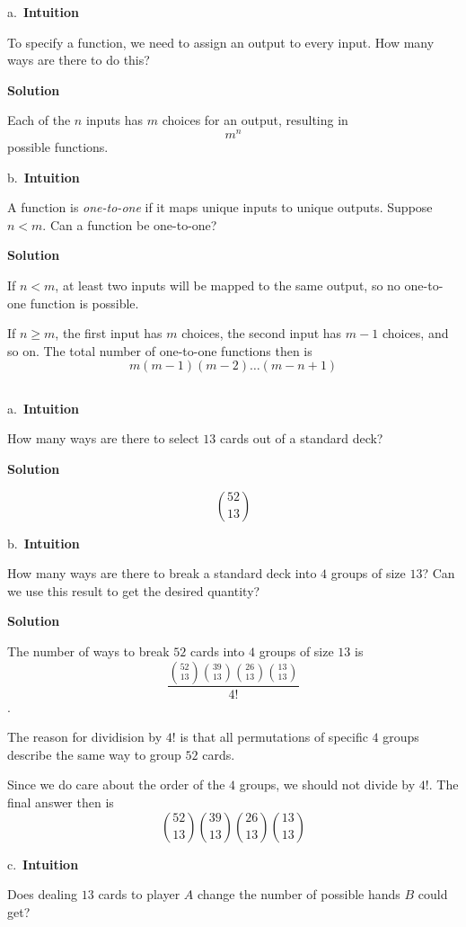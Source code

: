 \documentclass[]{book}
\begin{document}
a.~\textbf{Intuition}

To specify a function, we need to assign an output to every input. How
many ways are there to do this?

 \textbf{Solution}

Each of the \(n\) inputs has \(m\) choices for an output, resulting in
\[m^{n}\] possible functions.

b.~\textbf{Intuition}

A function is \emph{one-to-one} if it maps unique inputs to unique
outputs. Suppose \(n < m\). Can a function be one-to-one?

 \textbf{Solution}

If \(n < m\), at least two inputs will be mapped to the same output, so
no one-to-one function is possible.

If \(n \geq m\), the first input has \(m\) choices, the second input has
\(m - 1\) choices, and so on. The total number of one-to-one functions
then is \[m(m-1)(m-2)\dots(m-n+1)\]

\subsection{}\label{section-11}

a.~\textbf{Intuition}

How many ways are there to select \(13\) cards out of a standard deck?

 \textbf{Solution}

\[{52 \choose 13}\]

b.~\textbf{Intuition}

How many ways are there to break a standard deck into \(4\) groups of
size \(13\)? Can we use this result to get the desired quantity?

 \textbf{Solution}

The number of ways to break \(52\) cards into \(4\) groups of size
\(13\) is
\[\frac{{52 \choose 13}{39 \choose 13}{26 \choose 13}{13 \choose 13}}{4!}\].

The reason for dividision by \(4!\) is that all permutations of specific
\(4\) groups describe the same way to group \(52\) cards.

Since we do care about the order of the \(4\) groups, we should not
divide by \({4!}\). The final answer then is
\[{52 \choose 13}{39 \choose 13}{26 \choose 13}{13 \choose 13}\]

c.~\textbf{Intuition}

Does dealing \(13\) cards to player \(A\) change the number of possible
hands \(B\) could get?
\end{document}
